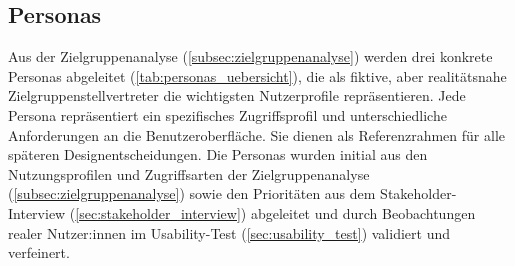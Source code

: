 \subsection{Personas}\label{sec:personas}

Aus der Zielgruppenanalyse (\autoref{subsec:zielgruppenanalyse}) werden drei konkrete Personas abgeleitet (\autoref{tab:personas_uebersicht}), die als fiktive, aber realitätsnahe Zielgruppenstellvertreter \parencite[Kap.~8.5]{erlhoferWebsiteKonzeptionUndRelaunch2017} die wichtigsten Nutzerprofile repräsentieren. Jede Persona repräsentiert ein spezifisches Zugriffsprofil und unterschiedliche Anforderungen an die Benutzeroberfläche. Sie dienen als Referenzrahmen für alle späteren Designentscheidungen. Die Personas wurden initial aus den Nutzungsprofilen und Zugriffsarten der Zielgruppenanalyse (\autoref{subsec:zielgruppenanalyse}) sowie den Prioritäten aus dem Stakeholder-Interview (\autoref{sec:stakeholder_interview}) abgeleitet und durch Beobachtungen realer Nutzer:innen im Usability-Test (\autoref{sec:usability_test}) validiert und verfeinert.

